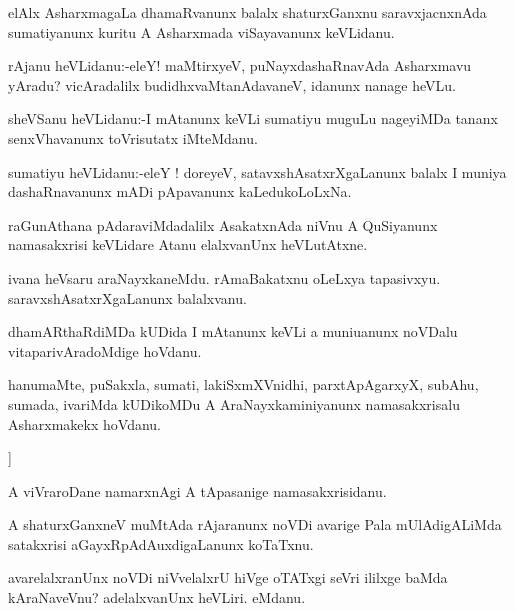 \documentclass{article}
\begin{document}
\begin{mn}%
elAlx AsharxmagaLa dhamaRvanunx balalx shaturxGanxnu saravxjacnxnAda sumatiyanunx kuritu A 
Asharxmada viSayavanunx keVLidanu.
\end{mn}

\begin{mn}%
rAjanu heVLidanu:-eleY! maMtirxyeV, puNayxdashaRnavAda Asharxmavu yAradu? vicAradalilx 
budidhxvaMtanAdavaneV, idanunx nanage heVLu.
\end{mn}

\begin{mn}%
sheVSanu heVLidanu:-I mAtanunx keVLi sumatiyu muguLu nageyiMDa tananx senxVhavanunx 
toVrisutatx iMteMdanu.
\end{mn}

\begin{mn}%
sumatiyu heVLidanu:-eleY !  doreyeV, satavxshAsatxrXgaLanunx balalx I muniya 
dashaRnavanunx mADi pApavanunx kaLedukoLoLxNa.
\end{mn}

\begin{mn}%
raGunAthana pAdaraviMdadalilx AsakatxnAda niVnu A QuSiyanunx namasakxrisi keVLidare Atanu 
elalxvanUnx heVLutAtxne.
\end{mn}

\begin{mn}%
ivana heVsaru araNayxkaneMdu. rAmaBakatxnu oLeLxya tapasivxyu. saravxshAsatxrXgaLanunx 
balalxvanu.
\end{mn}

\begin{mn}%
dhamARthaRdiMDa kUDida I mAtanunx keVLi a muniuanunx noVDalu vitaparivAradoMdige hoVdanu.
\end{mn}

\begin{mn}%
hanumaMte, puSakxla, sumati, lakiSxmXVnidhi, parxtApAgarxyX, subAhu, sumada, ivariMda 
kUDikoMDu A AraNayxkaminiyanunx namasakxrisalu Asharxmakekx hoVdanu.
\end{mn}]

\begin{mn}%
A viVraroDane namarxnAgi A tApasanige namasakxrisidanu.
\end{mn}

\begin{mn}%
A shaturxGanxneV muMtAda rAjaranunx noVDi avarige Pala mUlAdigALiMda satakxrisi 
aGayxRpAdAuxdigaLanunx koTaTxnu.
\end{mn}

\begin{mn}%
avarelalxranUnx noVDi niVvelalxrU hiVge oTATxgi seVri ililxge baMda kAraNaveVnu? 
adelalxvanUnx heVLiri. eMdanu.
\end{mn}
\end{document}
